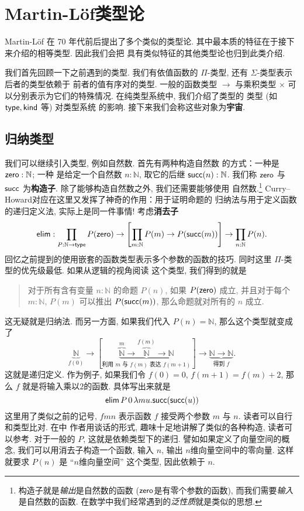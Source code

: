 \chapter{Martin-L\"of类型论}\label{martinlof}

Martin-L\"of 在 70 年代前后提出了多个类似的类型论.
其中最本质的特征在于接下来介绍的相等类型. 因此我们会把
具有类似特征的其他类型论也归到此类介绍.

我们首先回顾一下之前遇到的类型. 我们有依值函数的
\(\Pi\)-类型, 还有 \(\Sigma\)-类型表示后者的类型依赖于
前者的值有序对的类型. 一般的函数类型 \(\to\) 与乘积类型
\(\times\) 可以分别表示为它们的特殊情况.
在纯类型系统中, 我们介绍了类型的
类型 (如 \(\textsf{type}, \textsf{kind}\) 等) 对类型系统
的影响. 接下来我们会称这些对象为\textbf{宇宙}.

\section{归纳类型}

我们可以继续引入类型, 例如自然数. 首先有两种构造自然数
的方式：一种是 \(\textsf{zero} : \mathbb N\); 一种
是给定一个自然数 \(n : \mathbb N\), 取它的后继
\(\textsf{succ}(n) : \mathbb N\). 我们称
\(\textsf{zero}\) 与 \(\textsf{succ}\) 为\textbf{构造子}.
除了能够构造自然数之外, 我们还需要能够使用
自然数.\footnote{构造子就是\emph{输出}是自然数的函数
(\(\textsf{zero}\)是有零个参数的函数), 而我们需要\emph{输入}是自然数的函数.
在数学中我们经常遇到的\emph{泛性质}就是类似的思想.}
Curry--Howard对应在这里又发挥了神奇的作用：用于证明命题的
归纳法与用于定义函数的递归定义法, 实际上是同一件事情!
考虑\textbf{消去子}
\[\textsf{elim} :
\prod_{P : \mathbb N \to \textsf{type}}
P(\textsf{zero}) \to
\left[\prod_{m : \mathbb N} P(m) \to P(\textsf{succ}(m))\right]
\to \prod_{n : \mathbb N} P(n).\]
回忆之前提到的使用嵌套的函数类型表示多个参数的函数的技巧.
同时这里 \(\Pi\)-类型的优先级最低. 如果从逻辑的视角阅读
这个类型, 我们得到的就是
\begin{quotation}
对于所有含有变量 \(n : \mathbb N\) 的命题 \(P(n)\),
如果 \(P(\textsf{zero})\) 成立, 并且对于每个
\(m : \mathbb N\), \(P(m)\) 可以推出 \(P(\textsf{succ}(m))\),
那么命题就对所有的 \(n\) 成立.
\end{quotation}
这无疑就是归纳法. 而另一方面, 如果我们代入 \(P(n) = \mathbb N\),
那么这个类型就变成了
\[\underbrace{\mathbb N}_{f(0)} \to
[\underbrace{\overbrace{\mathbb N}^{m} \to \overbrace{\mathbb N}^{f(m)} \to \mathbb N}
_{\text{利用 \(m\) 与 \(f(m)\) 表达 \(f(m+1)\)}}] \to
\underbrace{\mathbb N \to \mathbb N}_{\text{得到 \(f\)}}.\]
这就是递归定义. 作为例子, 如果我们令
\(f(0) = 0\), \(f(m+1) = f(m)+2\), 那么
\(f\) 就是将输入乘以\(2\)的函数. 具体写出来就是
\[\textsf{elim}\, P\,0\,\lambda m u. \textsf{succ}(\textsf{succ}(u))\]
这里用了类似之前的记号, \(fmn\) 表示函数 \(f\) 接受两个参数 \(m\) 与 \(n\).
读者可以自行和类型比对. 在\cite{friedman:2018:typer}中
作者用谈话的形式, 趣味十足地讲解了类似的各种构造,
读者可以参考. 对于一般的 \(P\), 这就是依赖类型下的递归.
譬如如果定义了向量空间的概念, 我们可以用消去子构造一个函数,
输入 \(n\), 输出 \(n\)维向量空间中的零向量. 这样就要求
\(P(n)\) 是 “\(n\)维向量空间” 这个类型, 因此依赖于 \(n\).

